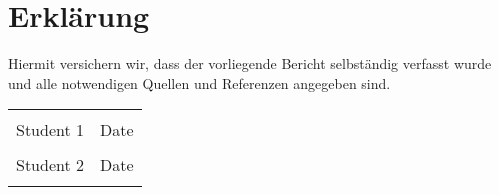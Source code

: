\section*{Erklärung}

Hiermit versichern wir, dass der vorliegende Bericht selbständig verfasst wurde und alle notwendigen Quellen und Referenzen angegeben sind.

\begin{tabular}{@{}p{2.5in}p{2.5in}@{}}
	\\[5\bigskipamount]
	\dotfill & \dotfill \\
	Student 1 & Date \\[5\bigskipamount]
	\dotfill & \dotfill \\
	Student 2 & Date \\
	\centering
	
\end{tabular} 

